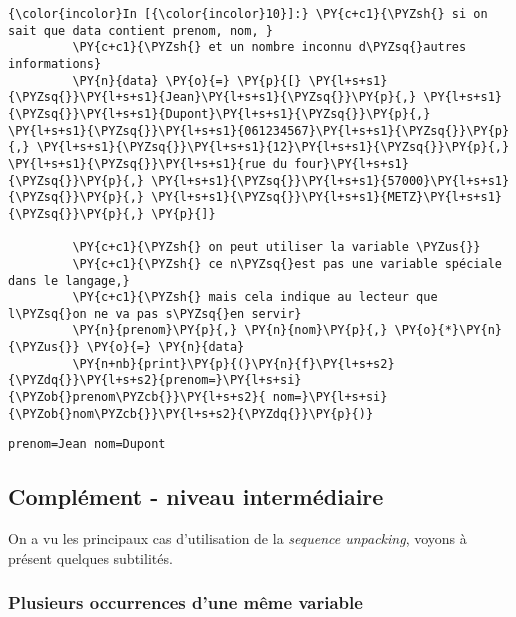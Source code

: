     \begin{Verbatim}[commandchars=\\\{\}]
{\color{incolor}In [{\color{incolor}10}]:} \PY{c+c1}{\PYZsh{} si on sait que data contient prenom, nom, }
         \PY{c+c1}{\PYZsh{} et un nombre inconnu d\PYZsq{}autres informations}
         \PY{n}{data} \PY{o}{=} \PY{p}{[} \PY{l+s+s1}{\PYZsq{}}\PY{l+s+s1}{Jean}\PY{l+s+s1}{\PYZsq{}}\PY{p}{,} \PY{l+s+s1}{\PYZsq{}}\PY{l+s+s1}{Dupont}\PY{l+s+s1}{\PYZsq{}}\PY{p}{,} \PY{l+s+s1}{\PYZsq{}}\PY{l+s+s1}{061234567}\PY{l+s+s1}{\PYZsq{}}\PY{p}{,} \PY{l+s+s1}{\PYZsq{}}\PY{l+s+s1}{12}\PY{l+s+s1}{\PYZsq{}}\PY{p}{,} \PY{l+s+s1}{\PYZsq{}}\PY{l+s+s1}{rue du four}\PY{l+s+s1}{\PYZsq{}}\PY{p}{,} \PY{l+s+s1}{\PYZsq{}}\PY{l+s+s1}{57000}\PY{l+s+s1}{\PYZsq{}}\PY{p}{,} \PY{l+s+s1}{\PYZsq{}}\PY{l+s+s1}{METZ}\PY{l+s+s1}{\PYZsq{}}\PY{p}{,} \PY{p}{]}
         
         \PY{c+c1}{\PYZsh{} on peut utiliser la variable \PYZus{}}
         \PY{c+c1}{\PYZsh{} ce n\PYZsq{}est pas une variable spéciale dans le langage,}
         \PY{c+c1}{\PYZsh{} mais cela indique au lecteur que l\PYZsq{}on ne va pas s\PYZsq{}en servir}
         \PY{n}{prenom}\PY{p}{,} \PY{n}{nom}\PY{p}{,} \PY{o}{*}\PY{n}{\PYZus{}} \PY{o}{=} \PY{n}{data}
         \PY{n+nb}{print}\PY{p}{(}\PY{n}{f}\PY{l+s+s2}{\PYZdq{}}\PY{l+s+s2}{prenom=}\PY{l+s+si}{\PYZob{}prenom\PYZcb{}}\PY{l+s+s2}{ nom=}\PY{l+s+si}{\PYZob{}nom\PYZcb{}}\PY{l+s+s2}{\PYZdq{}}\PY{p}{)}
\end{Verbatim}


    \begin{Verbatim}[commandchars=\\\{\}]
prenom=Jean nom=Dupont

    \end{Verbatim}

    \hypertarget{compluxe9ment---niveau-intermuxe9diaire}{%
\subsection{Complément - niveau
intermédiaire}\label{compluxe9ment---niveau-intermuxe9diaire}}

    On a vu les principaux cas d'utilisation de la \emph{sequence
unpacking}, voyons à présent quelques subtilités.

    \hypertarget{plusieurs-occurrences-dune-muxeame-variable}{%
\subsubsection{Plusieurs occurrences d'une même
variable}\label{plusieurs-occurrences-dune-muxeame-variable}}


